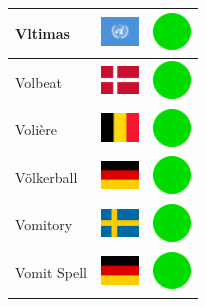 \documentclass[12pt, a4paper, twoside]{report}
\begin{document}
\begin{center}
\begin{longtable}{|p{5cm}|p{2cm}|p{2cm}|}
 Vltimas                                                    & \includegraphics[width=1cm]{../img/flags/un} &   \includegraphics[width=1cm]{../likes/y} \\ \hline
 Volbeat                                                    & \includegraphics[width=1cm]{../img/flags/dk} &   \includegraphics[width=1cm]{../likes/y} \\ \hline
 Volière                                                    & \includegraphics[width=1cm]{../img/flags/be} &   \includegraphics[width=1cm]{../likes/y} \\ \hline
 Völkerball                                                 & \includegraphics[width=1cm]{../img/flags/de} &   \includegraphics[width=1cm]{../likes/y} \\ \hline
 Vomitory                                                   & \includegraphics[width=1cm]{../img/flags/se} &   \includegraphics[width=1cm]{../likes/y} \\ \hline
 Vomit Spell                                                & \includegraphics[width=1cm]{../img/flags/de} &   \includegraphics[width=1cm]{../likes/y} \\ \hline

\end{longtable}
\end{center}
\end{document}
